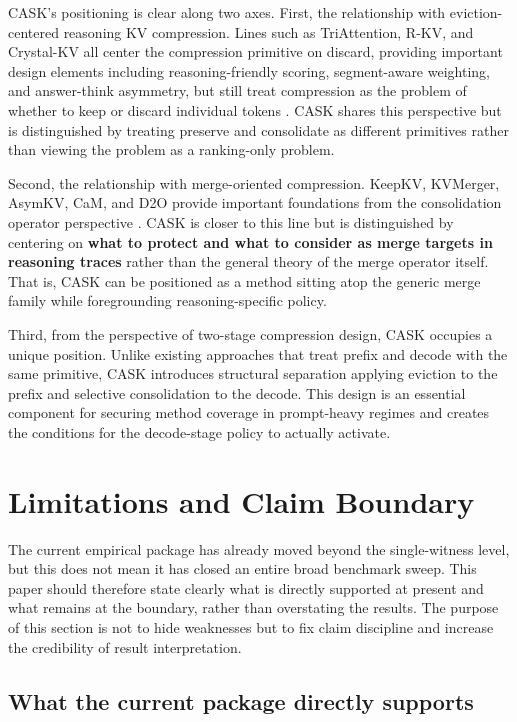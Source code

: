 CASK's positioning is clear along two axes. First, the relationship with eviction-centered reasoning KV compression. Lines such as TriAttention, R-KV, and Crystal-KV all center the compression primitive on discard, providing important design elements including reasoning-friendly scoring, segment-aware weighting, and answer-think asymmetry, but still treat compression as the problem of whether to keep or discard individual tokens \citep{mao2026triattention,cai2025rkv,wang2026crystalkv}. CASK shares this perspective but is distinguished by treating preserve and consolidate as different primitives rather than viewing the problem as a ranking-only problem.


Second, the relationship with merge-oriented compression. KeepKV, KVMerger, AsymKV, CaM, and D2O provide important foundations from the consolidation operator perspective \citep{tian2025keepkv,wang2024kvmerger,qian2025asymkv,zhang2024cam,wan2024d2o}. CASK is closer to this line but is distinguished by centering on \textbf{what to protect and what to consider as merge targets in reasoning traces} rather than the general theory of the merge operator itself. That is, CASK can be positioned as a method sitting atop the generic merge family while foregrounding reasoning-specific policy.


Third, from the perspective of two-stage compression design, CASK occupies a unique position. Unlike existing approaches that treat prefix and decode with the same primitive, CASK introduces structural separation applying eviction to the prefix and selective consolidation to the decode. This design is an essential component for securing method coverage in prompt-heavy regimes and creates the conditions for the decode-stage policy to actually activate.


\section{Limitations and Claim Boundary}


The current empirical package has already moved beyond the single-witness level, but this does not mean it has closed an entire broad benchmark sweep. This paper should therefore state clearly what is directly supported at present and what remains at the boundary, rather than overstating the results. The purpose of this section is not to hide weaknesses but to fix claim discipline and increase the credibility of result interpretation.


\subsection{What the current package directly supports}


